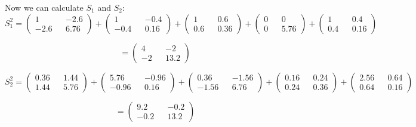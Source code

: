 \documentclass{article}
\begin{document}
Now we can calculate $S_1$ and $S_2$:
\begin{equation*}
    S_1^2 = \begin{pmatrix}
        1 && -2.6\\-2.6 && 6.76
    \end{pmatrix} + \begin{pmatrix}
        1 && -0.4\\-0.4&&0.16
    \end{pmatrix}+\begin{pmatrix}
        1 && 0.6 \\ 0.6 && 0.36
    \end{pmatrix} + \begin{pmatrix}
        0 && 0 \\ 0 && 5.76
    \end{pmatrix} + \begin{pmatrix}
        1 && 0.4 \\ 0.4 && 0.16
    \end{pmatrix}
\end{equation*}

\begin{equation*}
    = \begin{pmatrix}
        4 && -2 \\ -2 && 13.2
    \end{pmatrix}
\end{equation*}

\begin{equation*}
    S_2^2 = \begin{pmatrix}
        0.36&&1.44\\1.44&&5.76
    \end{pmatrix} + \begin{pmatrix}
        5.76&&-0.96\\-0.96&&0.16
    \end{pmatrix} + \begin{pmatrix}
        0.36&&-1.56\\-1.56&&6.76
    \end{pmatrix} + \begin{pmatrix}
        0.16&&0.24\\0.24&&0.36
    \end{pmatrix}+\begin{pmatrix}
        2.56&&0.64\\0.64&&0.16
    \end{pmatrix}
\end{equation*}

\begin{equation*}
    = \begin{pmatrix}
        9.2 && -0.2\\-0.2&&13.2
    \end{pmatrix}
\end{equation*}
\end{document}
